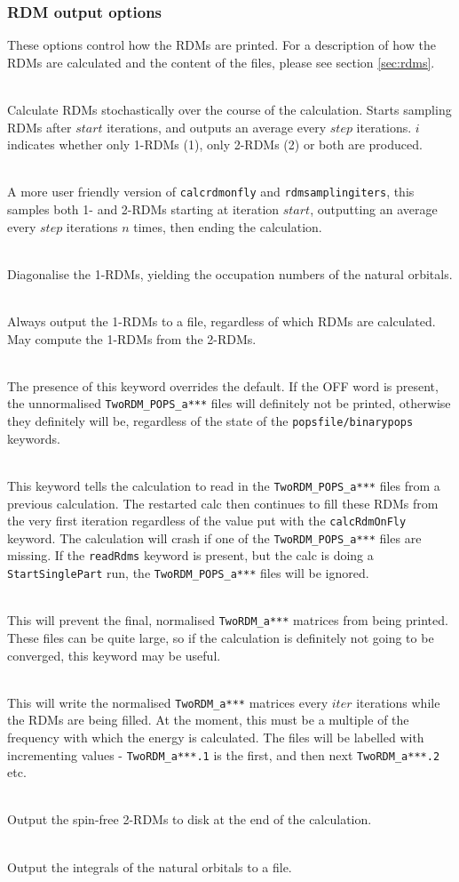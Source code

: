 \documentclass[a4paper,notitlepage,dvipsnames]{scrreprt}
\newcommand\codeitem[1]{\needspace{1.5\baselineskip}\item[\textnormal{\ttfamily #1 \nopagebreak}] \hfill \\ \nopagebreak}
\let\code\lstinline
\begin{document}
    \subsubsection{RDM output options}
    These options control how the RDMs are printed. For a description of how
    the RDMs are calculated and the content of the files, please see section \ref{sec:rdms}.
    \begin{description}
      \codeitem{calcRdmOnfly $i$ $step$ $start$}
      Calculate RDMs stochastically over the course of the calculation. Starts
      sampling RDMs after $start$ iterations, and outputs an average every $step$
      iterations. $i$ indicates whether only 1-RDMs (1), only 2-RDMs (2) or
      both are produced.
      \codeitem{rdmLinSpace $start$ $n$ $step$}
      A more user friendly version of \texttt{calcrdmonfly} and \texttt{rdmsamplingiters}, this samples both
      1- and 2-RDMs starting at iteration $start$, outputting an average every
      $step$ iterations $n$ times, then ending the calculation.
      \codeitem{diagFlyOneRdm}
      Diagonalise the 1-RDMs, yielding the occupation numbers of the natural
      orbitals.
      \codeitem{printOneRdm}
      Always output the 1-RDMs to a file, regardless of which RDMs are
      calculated. May compute the 1-RDMs from the 2-RDMs.
      \codeitem{writeRdmsToRead off}
      The presence of this keyword overrides the default.  If the OFF word is present, the unnormalised \code{TwoRDM_POPS_a***}
    files will definitely not be printed, otherwise they definitely will be, regardless of the state of the
    \code{popsfile/binarypops} keywords.

    \codeitem{readRdms}
    This keyword tells the calculation to read in the \code{TwoRDM_POPS_a***} files from a previous calculation.  The
    restarted calc then continues to fill these RDMs from the very first iteration regardless of the value put with
    the \code{calcRdmOnFly} keyword.  The calculation will crash if one of the \code{TwoRDM_POPS_a***} files are missing.  If
    the \code{readRdms} keyword is present, but the calc is doing a \code{StartSinglePart} run, the \code{TwoRDM_POPS_a***} files
    will be ignored.

    \codeitem{noNormRdms}
    This will prevent the final, normalised \code{TwoRDM_a***} matrices from being printed.  These files can be quite
    large, so if the calculation is definitely not going to be converged, this keyword may be useful.

    \codeitem{writeRdmsEvery $iter$}
    This will write the normalised \code{TwoRDM_a***} matrices every $iter$ iterations while the RDMs are being
    filled.  At the moment, this must be a multiple of the frequency with which the energy is calculated.  The
    files will be labelled with incrementing values - \code{TwoRDM_a***.1} is
    the first, and then next \code{TwoRDM_a***.2} etc.
    \codeitem{write-spin-free-rdm}
    Output the spin-free 2-RDMs to disk at the end of the calculation.
      \codeitem{printRoDump}
      Output the integrals of the natural orbitals to a file.


\end{description}
\end{document}
